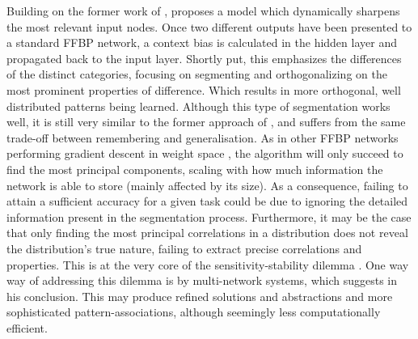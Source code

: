 Building on the former work of \cite{French1992}, \cite{French1994} proposes a model which dynamically sharpens the most relevant input nodes. Once two different outputs have been presented to a standard FFBP network, a context bias is calculated in the hidden layer and propagated back to the input layer. Shortly put, this emphasizes the differences of the distinct categories, focusing on segmenting and orthogonalizing on the most prominent properties of difference. Which results in more orthogonal, well distributed patterns being learned.
Although this type of segmentation works well, it is still very similar to the former approach of \cite{French1992}, and suffers from the same trade-off between remembering and generalisation. As in other FFBP networks performing gradient descent in weight space \citep{Hinton1989}, the algorithm will only succeed to find the most principal components, scaling with how much information the network is able to store (mainly affected by its size). As a consequence, failing to attain a sufficient accuracy for a given task could be due to ignoring the detailed information present in the segmentation process. Furthermore, it may be the case that only finding the most principal correlations in a distribution does not reveal the distribution's true nature, failing to extract precise correlations and properties. This is at the very core of the sensitivity-stability dilemma \citep{Hebb1949}. One way way of addressing this dilemma is by multi-network systems, which \cite{French1994} suggests in his conclusion. This may produce refined solutions and abstractions and more sophisticated pattern-associations, although seemingly less computationally efficient.


\cleardoublepage